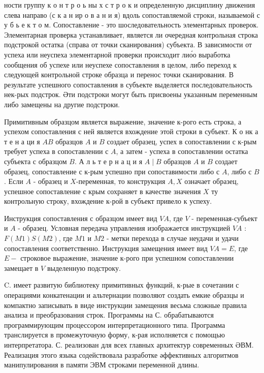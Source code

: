 \documentclass[10pt]{article}
\begin{document}
ности группу к о н т р о ь ны х с т р о к и определенную дисциплину движения слева направо (с к а н ир о в а н и я) вдоль сопоставляемой строки, называемой с у б ь е к т о м. Сопоставление - это шоследовательность элементарных проверок. Элементарная проверка устанавливает, является ли очередная контрольная строка подстрокой остатка (справа от точки сканирования) субъекта. В зависимости от успеха или неуспеха элементарной проверки происходит лио́о выработка сообщения об успехе или неуспехе сопоставления в целом, либо переход к следующей контрольной строке образца и перенос точки сканирования. В результате успешного сопоставления в субъекте выделяется последовательность нек-рых подстрок. Әти подстроки могут быть присвоены указанным переменным либо замещены на другие подстроки.



Примитивным образцом является выражение, значение к-рого есть строка, а успехом сопоставления с ней является вхождение этой строки в субъект. К о нк а т е н а ци я $A B$ образцов $A$ и $B$ создает образец, успех в сопоставлении с к-рым требует успеха в сопоставлении с $A$, а затем - успеха в сопоставлении остатка субъекта с образцом $B$. А л ь т е р н а ц и я $A \mid B$ образцов $A$ и $B$ создает образец, сопоставление с к-рым успешно при сопоставимости либо с $A$, либо с $B$. Если $A$ - образец и $X$-переменная, то конструкция $A, X$ означает образец, успешное сопоставление с крым сохраняет в качестве значения $X$ ту контрольную строку, вхождение к-рой в субъект привело к успеху.



Инструкция сопоставления с образцом имеет вид $V A$, где $V$ - переменная-субъект и $A$ - образец. Условная передача управления изображается инструкцией $V A$ : $F(M 1) S(M 2)$, где $M 1$ и $M 2$ - метки перехода в случае неудачи и удачи сопоставления соответственно. Инструкция замещения имеет вид $V A=E$, где $E-$ строковое выражение, значение к-рого при успешном сопоставлении замещает в $V$ выделенную подстроку.



C. имеет развитую библиотеку примитивных функций, к-рые в сочетании с операциями конкатенации и альтернации позволяют создать емкие образцы и компактно записывать в виде инструкции замещения весьма сложные правила анализа и преобразования строк. Программы на С. обрабатываются программирующим процессором интерпретационного типа. Программа транслируется в промежуточную форму, к-рая исполняется с помощью интерпретатора. С. реализован для всех главных архитектур современных ӘВМ. Реализация этого языка содействовала разработке әффективных алгоритмов манипулирования в памяти ЭВМ строками переменной длины.
\end{document}
